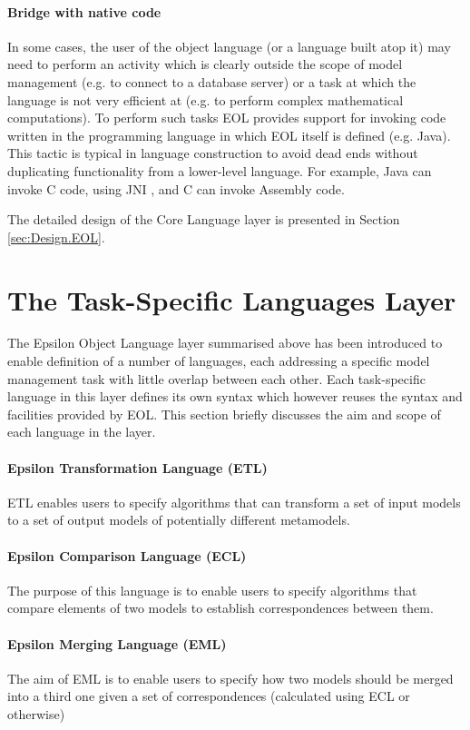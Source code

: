 \paragraph{Bridge with native code} In some cases, the user of the object language (or a language built atop it) may need to perform an activity which is clearly outside the scope of model management (e.g. to connect to a database server) or a task at which the language is not very efficient at (e.g. to perform complex mathematical computations). To perform such tasks EOL provides support for invoking code written in the programming language in which EOL itself is defined (e.g. Java). This tactic is typical in language construction to avoid dead ends without duplicating functionality from a lower-level language. For example, Java can invoke C code, using JNI \cite{JNI}, and C can invoke Assembly code.

\noindent The detailed design of the Core Language layer is presented in Section \ref{sec:Design.EOL}.

\section{The Task-Specific Languages Layer}
\label{sec:Architecture.TaskSpecificLanguages}

The Epsilon Object Language layer summarised above has been introduced to enable definition of a number of languages, each addressing a specific model management task with little overlap between each other. Each task-specific language in this layer defines its own syntax which however reuses the syntax and facilities provided by EOL. This section briefly discusses the aim and scope of each language in the layer.

\paragraph{Epsilon Transformation Language (ETL)} ETL enables users to specify algorithms that can transform a set of input models to a set of output models of potentially different metamodels.

\paragraph{Epsilon Comparison Language (ECL)}
The purpose of this language is to enable users to specify algorithms that compare elements of two models to establish correspondences between them.

\paragraph{Epsilon Merging Language (EML)} The aim of EML is to enable users to specify how two models should be merged into a third one given a set of correspondences (calculated using ECL or otherwise)

